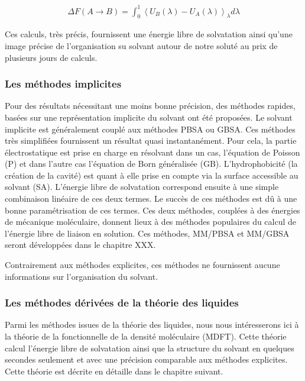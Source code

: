 \begin{eqnarray}
\Delta F(A \rightarrow B) =  \int_0^1 \left\langle U_B(\lambda) - U_A(\lambda) \right\rangle_{\lambda} d\lambda
\end{eqnarray}

Ces calculs, très précis, fournissent une énergie libre de solvatation ainsi qu'une image précise de l'organisation su solvant autour de notre soluté au prix de plusieurs jours de calculs.



\subsubsection{Les méthodes implicites}
Pour des résultats nécessitant une moins bonne précision, des méthodes rapides, basées sur une représentation implicite du solvant ont été proposées\cite{Skyner_review_2015}. Le solvant implicite est généralement couplé aux méthodes PBSA ou GBSA. Ces méthodes très simplifiées fournissent un résultat quasi instantanément. Pour cela, la partie électrostatique est prise en charge en résolvant dans un cas, l'équation de Poisson (P) et dans l'autre cas l'équation de Born généralisée (GB). L'hydrophobicité (la création de la cavité) est quant à elle prise en compte via la surface accessible au solvant (SA). L'énergie libre de solvatation correspond ensuite à une simple combinaison linéaire de ces deux termes. Le succès de ces méthodes est dû à une bonne paramétrisation de ces termes. Ces deux méthodes, couplées à des énergies de mécanique moléculaire, donnent lieux à des méthodes  populaires du calcul de l'énergie libre de liaison en solution. Ces méthodes, MM/PBSA\cite{Genheden__MMPBSA_2015} et MM/GBSA seront développées dans le chapitre XXX.

Contrairement aux méthodes explicites, ces méthodes ne fournissent aucune informations sur l'organisation du solvant.


\subsubsection{Les méthodes dérivées de la théorie des liquides}
Parmi les méthodes issues de la théorie des liquides, nous nous intéresserons ici à la théorie de la fonctionnelle de la densité moléculaire (MDFT). Cette théorie calcul l'énergie libre de solvatation ainsi que la structure du solvant en quelques secondes seulement et avec une précision comparable aux méthodes explicites. Cette théorie est décrite en détaille dans le chapitre suivant.




